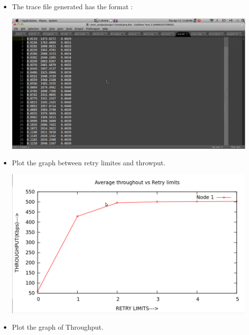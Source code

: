 \documentclass[a4paper,12pt]{article}
\begin{document}
\begin{itemize}
 \item The trace file generated has the format : \\
  \begin{center}
 \includegraphics[bb=0 0 716 679,scale=0.35]{trace.png}
\end{center}
\newpage
 \item Plot the graph  between retry limites and throwput.
 \begin{center}
 \includegraphics[bb=0 0 1148 687,scale=0.4]{retry.png}
\end{center}
\newpage
 \item Plot the graph  of Throughput.
 \begin{center}

\end{center}
\end{itemize}
\end{document}
